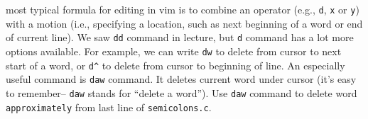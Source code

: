 most typical formula for editing in vim is to combine an operator (e.g., {\tt d}, {\tt x} or {\tt y}) with a motion (i.e., specifying a location, such as  next beginning of a word or  end of  current line). We saw  {\tt dd} command in lecture, but  {\tt d} command has a lot more options available. For example, we can write {\tt dw} to delete from  cursor to  next start of a word, or {\tt d\^} to delete from  cursor to  beginning of  line. An especially useful command is  {\tt daw} command. It deletes  current word under  cursor (it's easy to remember-- {\tt daw} stands for ``delete a word''). Use  {\tt daw} command to delete  word {\tt approximately} from  last line of \verb|semicolons.c|.
